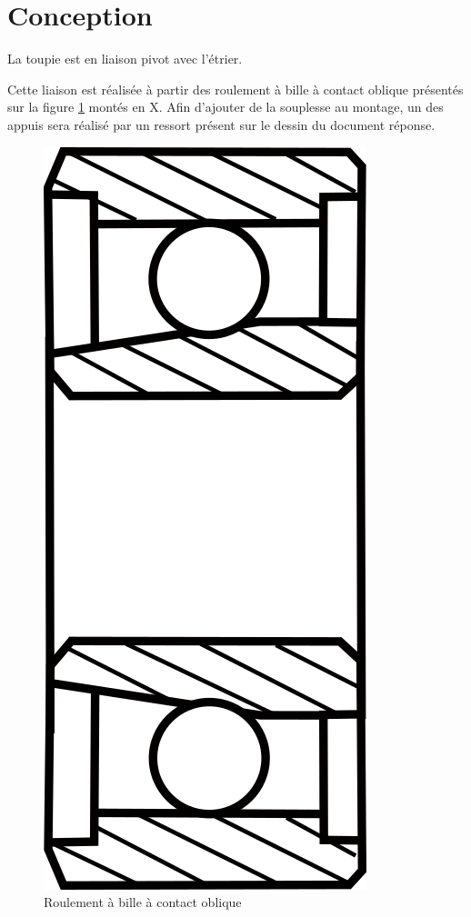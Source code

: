 




\section{Conception}

La toupie est en liaison pivot avec l’étrier.

Cette liaison est réalisée à partir des roulement à bille à contact oblique présentés sur la figure \ref{fig23} montés en X. Afin d'ajouter de la souplesse au montage, un des appuis sera réalisé par un ressort présent sur le dessin du document réponse.

\begin{figure}[ht]
\begin{center}
\includegraphics[width=0.1\linewidth]{img/fig23}
\caption{Roulement à bille à contact oblique}
\label{fig23}
\end{center}
\end{figure}

